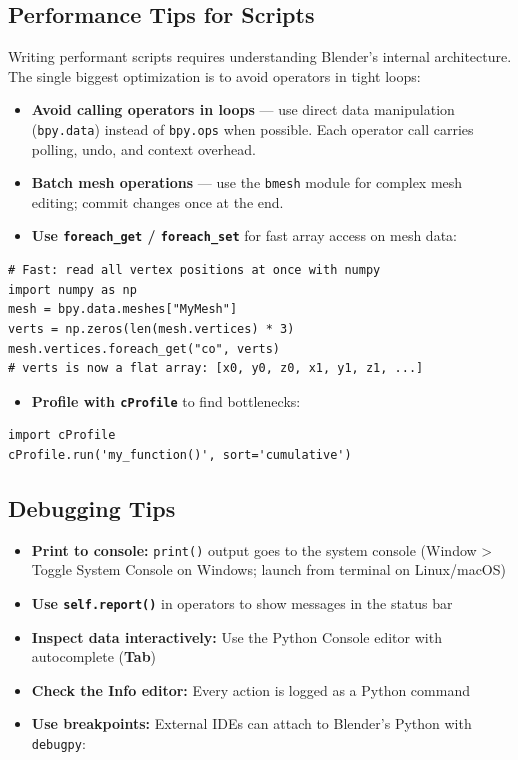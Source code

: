 \subsection{Performance Tips for Scripts}

Writing performant scripts requires understanding Blender's internal architecture. The single biggest optimization is to avoid operators in tight loops:

\begin{itemize}[leftmargin=2em]
  \item \textbf{Avoid calling operators in loops} --- use direct data manipulation (\texttt{bpy.data}) instead of \texttt{bpy.ops} when possible. Each operator call carries polling, undo, and context overhead.
  \item \textbf{Batch mesh operations} --- use the \texttt{bmesh} module for complex mesh editing; commit changes once at the end.
  \item \textbf{Use \texttt{foreach\_get} / \texttt{foreach\_set}} for fast array access on mesh data:
\end{itemize}

\begin{lstlisting}
# Fast: read all vertex positions at once with numpy
import numpy as np
mesh = bpy.data.meshes["MyMesh"]
verts = np.zeros(len(mesh.vertices) * 3)
mesh.vertices.foreach_get("co", verts)
# verts is now a flat array: [x0, y0, z0, x1, y1, z1, ...]
\end{lstlisting}

\begin{itemize}[leftmargin=2em]
  \item \textbf{Profile with \texttt{cProfile}} to find bottlenecks:
\end{itemize}

\begin{lstlisting}
import cProfile
cProfile.run('my_function()', sort='cumulative')
\end{lstlisting}

\subsection{Debugging Tips}

\begin{itemize}[leftmargin=2em]
  \item \textbf{Print to console:} \texttt{print()} output goes to the system console (Window > Toggle System Console on Windows; launch from terminal on Linux/macOS)
  \item \textbf{Use \texttt{self.report()}} in operators to show messages in the status bar
  \item \textbf{Inspect data interactively:} Use the Python Console editor with autocomplete (\textbf{Tab})
  \item \textbf{Check the Info editor:} Every action is logged as a Python command
  \item \textbf{Use breakpoints:} External IDEs can attach to Blender's Python with \texttt{debugpy}:
\end{itemize}

